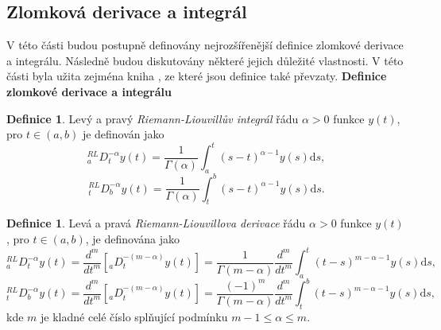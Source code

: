 \documentclass[a4paper,12pt,twoside]{article}
\theoremstyle{definition}
\newtheorem{defin}[veta]{Definice}
\theoremstyle{remark}
\numberwithin{equation}{section}
\numberwithin{table}{section}
\numberwithin{figure}{section}
\newcommand{\dx}[1]{\mathrm{d} #1}
\begin{document}
\subsection{Zlomková derivace a integrál}
	V této části budou postupně definovány nejrozšířenější definice zlomkové derivace a integrálu. Následně budou diskutovány některé jejich důležité vlastnosti. V této části byla užita zejména kniha \cite{Cangpin}, ze které jsou definice také převzaty.
\textbf{Definice zlomkové derivace a integrálu}

\begin{defin}
	Levý a pravý \emph{Riemann-Liouvillův integrál} řádu $\alpha > 0$ funkce $y\left(t\right)$, pro $t \in \left(a,b\right)$ je definován jako
	\begin{equation} \label{RiemannIntegral}
	^{RL}_{a}D_{t}^{-\alpha} y\left( t\right)  = \frac{1}{\Gamma \left( \alpha\right)} \int_{a}^{t} \left( s-t \right)^{\alpha -1} y\left( s\right)  \dx s, 
\end{equation}	
	$$ ^{RL}_{t}D_{b}^{-\alpha} y\left( t\right)  = \frac{1}{\Gamma \left( \alpha\right)} \int_{t}^{b} \left( s-t \right)^{\alpha -1} y\left( s\right)  \dx s. $$
\end{defin}

\begin{defin} %
	Levá a pravá \emph{Riemann-Liouvillova derivace} řádu $\alpha > 0 $ funkce $y\left(t\right)$, pro $t \in \left(a, b\right)$, je definována jako
	$$
		{^{RL}_{a}D_{t}^{-\alpha} y\left( t\right)} = \frac{d^{m}}{dt^{m}} \left[_{a}D^{-\left(m-\alpha\right)}_{t} y\left(t\right)\right] = {\frac{1}{\Gamma \left( m -\alpha \right)}} {\frac{d^{m}}{dt^m}} \int_{a}^{t} \left(t-s\right)^{m-\alpha-1} y\left(s\right)\dx{s},
	$$
	$$
	{^{RL}_{t}D_{b}^{-\alpha} y\left( t\right)} = \frac{d^{m}}{dt^{m}} \left[_{a}D^{-\left(m-\alpha\right)}_{t} y\left(t\right)\right] = 		{\frac{\left(-1\right)^{m}}{\Gamma \left( m -\alpha \right)}} {\frac{d^{m}}{dt^m}} \int_{t}^{b} \left(t-s\right)^{m-\alpha-1} y\left(s\right)\dx{s},
	$$
kde $m$ je kladné celé  číslo splňující podmínku $m-1 \leq \alpha \leq m$.
\end{defin}
\end{document}
